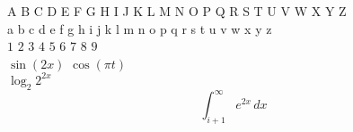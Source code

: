 \documentclass[20pt]{extreport}
\newcommand{\lowercaseheight}{1ex}
\newcommand{\uppercaseheight}{1.5ex}
\newenvironment{drillsheet}{%
\setlength\linenumbersep{0pt}%
\renewcommand{\thelinenumber}{%
    \begin{tikzpicture}[overlay]
            \draw [ultra thick] ((0,0) -- ++(\textwidth,0);
            \draw ((0,\lowercaseheight) -- ++(\textwidth,0);
            \draw [thick] (0,\uppercaseheight) -- ++(\textwidth,0);
    \end{tikzpicture}%
}%
\renewcommand\linenumberfont{\normalfont\color{black}}
\begin{linenumbers}%
    \color{black!25}%
}{
\end{linenumbers}%
}
\begin{document}
\Large
\begin{drillsheet}
A B C D E F G H I J K L M N O P Q R S T U V W X Y Z\\
a b c d e f g h i j k l m n o p q r s t u v w x y z\\
 $1$ $2$ $3$ $4$ $5$ $6$ $7$ $8$ $9$\\
 $\sin(2x)$ $\cos(\pi t)$\\
 $\log_2 2^{2x}$ \\
 \[\int_{i+1}^{\infty} e^{2x}\,dx\]

\end{drillsheet}
\end{document}
